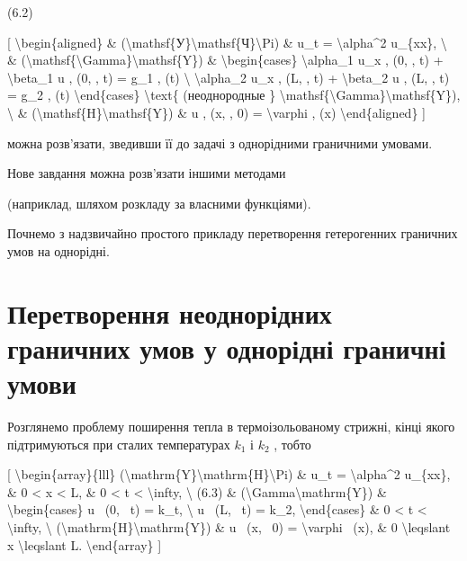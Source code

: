 \documentclass[
]{article}
\begin{document}
(6.2)

{[} \textbackslash begin\{aligned\} \&
(\textbackslash mathsf\{У\}\textbackslash mathsf\{Ч\}\textbackslash Pi)
\& u\_t = \textbackslash alpha\^{}2 u\_\{xx\}, \textbackslash{} \&
(\textbackslash mathsf\{\textbackslash Gamma\}\textbackslash mathsf\{Y\})
\& \textbackslash begin\{cases\} \textbackslash alpha\_1 u\_x , (0, , t)
+ \textbackslash beta\_1 u , (0, , t) = g\_1 , (t) \textbackslash{}
\textbackslash alpha\_2 u\_x , (L, , t) + \textbackslash beta\_2 u , (L,
, t) = g\_2 , (t) \textbackslash end\{cases\} \textbackslash text\{
(неоднородные \}
\textbackslash mathsf\{\textbackslash Gamma\}\textbackslash mathsf\{Y\}),
\textbackslash{} \&
(\textbackslash mathsf\{H\}\textbackslash mathsf\{Y\}) \& u , (x, , 0) =
\textbackslash varphi , (x) \textbackslash end\{aligned\} {]}

можна розв'язати, зведивши її до задачі з однорідними граничними
умовами.

Нове завдання можна розв'язати іншими методами

(наприклад, шляхом розкладу за власними функціями).

Почнемо з надзвичайно простого прикладу перетворення гетерогенних
граничних умов на однорідні.

\section{Перетворення неоднорідних граничних умов у однорідні граничні
умови}\label{ux43fux435ux440ux435ux442ux432ux43eux440ux435ux43dux43dux44f-ux43dux435ux43eux434ux43dux43eux440ux456ux434ux43dux438ux445-ux433ux440ux430ux43dux438ux447ux43dux438ux445-ux443ux43cux43eux432-ux443-ux43eux434ux43dux43eux440ux456ux434ux43dux456-ux433ux440ux430ux43dux438ux447ux43dux456-ux443ux43cux43eux432ux438}

Розглянемо проблему поширення тепла в термоізольованому стрижні, кінці
якого підтримуються при сталих температурах \(k_1\) і \(k_2\) , тобто

{[} \textbackslash begin\{array\}\{lll\}
(\textbackslash mathrm\{Y\}\textbackslash mathrm\{H\}\textbackslash Pi)
\& u\_t = \textbackslash alpha\^{}2 u\_\{xx\}, \& 0 \textless{} x
\textless{} L, \& 0 \textless{} t \textless{} \textbackslash infty,
\textbackslash{} (6.3) \&
(\textbackslash Gamma\textbackslash mathrm\{Y\}) \&
\textbackslash begin\{cases\} u ~(0, ~t) = k\_t, \textbackslash{} u ~(L,
~t) = k\_2, \textbackslash end\{cases\} \& 0 \textless{} t \textless{}
\textbackslash infty, \textbackslash{}
(\textbackslash mathrm\{H\}\textbackslash mathrm\{Y\}) \& u ~(x, ~0) =
\textbackslash varphi ~(x), \& 0 \textbackslash leqslant x
\textbackslash leqslant L. \textbackslash end\{array\} {]}
\end{document}
